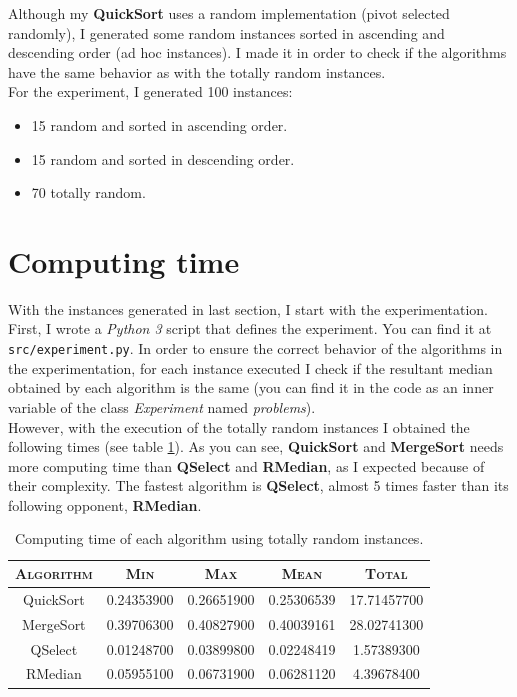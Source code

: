 \documentclass[letterpaper,12pt]{article}
\newcommand{\code}[1]{\texttt{#1}}
\begin{document}
Although my \textbf{QuickSort} uses a random implementation (pivot selected randomly), I generated some random instances sorted in ascending and descending order (ad hoc instances). I made it in order to check if the algorithms have the same behavior as with the totally random instances.\\

For the experiment, I generated 100 instances:
\begin{itemize}
    \item 15 random and sorted in ascending order.
    \item 15 random and sorted in descending order.
    \item 70 totally random.
\end{itemize}

\section{Computing time}
With the instances generated in last section, I start with the experimentation. First, I wrote a \textit{Python 3} script that defines the experiment. You can find it at \code{src/experiment.py}. In order to ensure the correct behavior of the algorithms in the experimentation, for each instance executed I check if the resultant median obtained by each algorithm is the same (you can find it in the code as an inner variable of the class \textit{Experiment} named \textit{problems}). \\

However, with the execution of the totally random instances I obtained the following times (see table \ref{tab:random}). As you can see, \textbf{QuickSort} and \textbf{MergeSort} needs more computing time than \textbf{QSelect} and \textbf{RMedian}, as I expected because of their complexity. The fastest algorithm is \textbf{QSelect}, almost 5 times faster than its following opponent, \textbf{RMedian}.\\

\begin{table}[htbp]
    \centering
    \begin{tabular}{c c c c c}
        \textsc{Algorithm} & \textsc{Min} & \textsc{Max} & \textsc{Mean} & \textsc{Total} \\ \hline
        QuickSort & 0.24353900 & 0.26651900 & 0.25306539 & 17.71457700 \\
        MergeSort & 0.39706300 & 0.40827900 & 0.40039161 & 28.02741300 \\
        QSelect & 0.01248700 & 0.03899800 & 0.02248419 & 1.57389300 \\
        RMedian & 0.05955100 & 0.06731900 & 0.06281120 & 4.39678400 \\
    \end{tabular}
    \caption{Computing time of each algorithm using totally random instances.}
    \label{tab:random}
\end{table}
\end{document}
